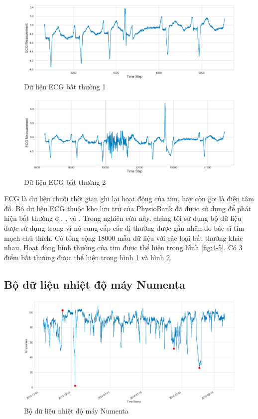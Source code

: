 \begin{figure}[H]
    \centering
    \includegraphics[scale=0.75]{./content/images/4-6.png}
    \caption{Dữ liệu ECG bất thường 1}
    \label{fig:4-6}
\end{figure}

\begin{figure}[H]
    \centering
    \includegraphics[scale=0.75]{./content/images/4-7.png}
    \caption{Dữ liệu ECG bất thường 2}
    \label{fig:4-7}
\end{figure}

ECG là dữ liệu chuỗi thời gian ghi lại hoạt động của tim, hay còn gọi là điện tâm đồ. Bộ dữ liệu ECG thuộc kho lưu trữ của PhysioBank đã được sử dụng để phát hiện bất thường ở \cite{st12}, \cite{st14}, \cite{st28} và \cite{st29}. Trong nghiên cứu này, chúng tôi sử dụng bộ dữ liệu được sử dụng trong \cite{st12} vì nó cung cấp các dị thường được gắn nhãn do bác sĩ tim mạch chú thích. Có tổng cộng 18000 mẫu dữ liệu với các loại bất thường khác nhau. Hoạt động bình thường của tim được thể hiện trong hình \ref{fig:4-5}. Có 3 điểm bất thường được thể hiện trong hình \ref{fig:4-6} và hình \ref{fig:4-7}.

\subsection{Bộ dữ liệu nhiệt độ máy Numenta}
\begin{figure}[H]
    \centering
    \includegraphics[scale=0.75]{./content/images/4-1.png}
    \caption{Bộ dữ liệu nhiệt độ máy Numenta}
    \label{fig:4-1}
\end{figure}

